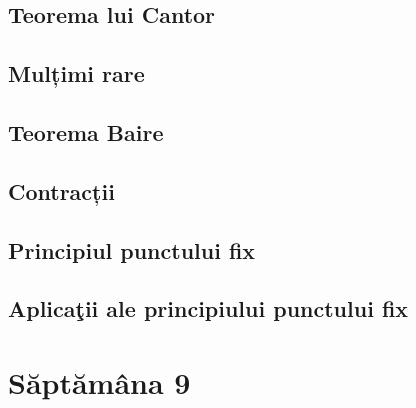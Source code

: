 \documentclass[a4paper,12pt]{article}
\theoremstyle{change}
\begin{document}
\subsection{Teorema lui Cantor}

\subsection{Mulțimi rare}

\subsection{Teorema Baire}


\subsection{Contracții}

\subsection{Principiul punctului fix}

\subsection{Aplicaţii ale principiului  punctului fix}

\section{Săptămâna 9}
\end{document}
